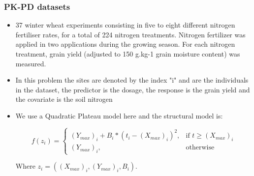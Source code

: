 \documentclass[xcolor={dvipsnames}]{beamer}
\begin{document}
\begin{frame}
\frametitle{PK-PD datasets}

\begin{itemize}
\item 37 winter wheat experiments consisting in five to eight different nitrogen fertiliser rates, for a total of 224 nitrogen treatments. Nitrogen fertilizer was applied in two applications during the growing season. For each nitrogen treatment, grain yield (adjusted to 150 g.kg-1 grain moisture content) was measured.
\item In this problem the sites are denoted by the index "i" and are the individuals in the dataset, the predictor is the dosage, the response is the grain yield and the covariate is the soil nitrogen

\item We use a Quadratic Plateau model here and the structural model is:




\begin{block}{}
\begin{equation}
    f(z_i)= 
\begin{cases}
    (Y_{max})_i + B_i*(t_i-(X_{max})_i)^2 ,& \text{if } t\geq (X_{max})_i\\
    (Y_{max})_i,              & \text{otherwise}
\end{cases}
\end{equation}
\end{block}
Where $z_i=((X_{max})_i,(Y_{max})_i,B_i)$.


\end{itemize}
\end{frame}
\end{document}
